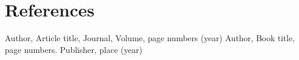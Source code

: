 \section{References}



%
%



\begin{thebibliography}{}
%
%
Author, Article title, Journal, Volume, page numbers (year)
Author, Book title, page numbers. Publisher, place (year)
\end{thebibliography}



